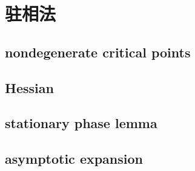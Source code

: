 \section{驻相法}
\label{b2:sec:2102}


\subsection{nondegenerate critical points}
\label{b2:subsec:210201}

\subsection{Hessian}
\label{b2:subsec:210202}

\subsection{stationary phase lemma}
\label{b2:subsec:210203}

\subsection{asymptotic expansion}
\label{b2:subsec:210204}


